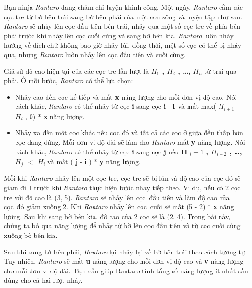 



   Bạn ninja   \emph{    Rantaro   }   đang chăm chỉ luyện khinh công. Một ngày,   \emph{    Rantaro   }   cắm các cọc tre từ bờ bên trái sang bờ bên phải của một con sông và luyện tập như sau:   \emph{    Rantaro   }   sẽ nhảy lên cọc đầu tiên bên trái, nhảy qua một số cọc tre về phía bên phải trước khi nhảy lên cọc cuối cùng và sang bờ bên kia.   \emph{    Rantaro   }   luôn nhảy hướng về đích chứ không bao giờ nhảy lùi, đồng thời, một số cọc có thể bị nhảy qua, nhưng   \emph{    Rantaro   }   luôn nhảy lên cọc đầu tiên và cuối cùng.  

   Giả sử độ cao hiện tại của các cọc tre lần lượt là   \textbf{    $H_{1}$    , $H_{2}$    , …, $H_{n}$}   từ trái qua phải. Ở mỗi bước,   \emph{    Rantaro   }   có thể lựa chọn:  
\begin{itemize}
	\item     Nhảy cao đến cọc kế tiếp và mất    \textbf{     x    }    năng lượng cho mỗi đơn vị độ cao. Nói cách khác,    \emph{     Rantaro    }    có thể nhảy từ cọc    \textbf{     i    }    sang cọc    \textbf{     i+1    }    và mất max(    \textbf{     $H_{i+1}$}    -    \textbf{     $H_{i}$}    , 0) *    \textbf{     x    }    năng lượng.   
	\item     Nhảy xa đến một cọc khác nếu cọc đó và tất cả các cọc ở giữa đều thấp hơn cọc đang đứng. Mỗi đơn vị độ dài sẽ làm cho    \emph{     Rantaro    }    mất    \textbf{     y    }    năng lượng. Nói cách khác,    \emph{     Rantaro    }    có thể nhảy từ cọc    \textbf{     i    }    sang cọc    \textbf{     j    }    nếu    \textbf{     H     \textbf{$_       i+1      $}     , $H_{i+2}$     , …, $H_{j}$     $<$ $H_{i}$}    và mất (    \textbf{     j    }    -    \textbf{     i    }    ) *    \textbf{     y    }    năng lượng.   
\end{itemize}

   Mỗi khi   \emph{    Rantaro   }   nhảy lên một cọc tre, cọc tre sẽ bị lún và độ cao của cọc đó sẽ giảm đi 1 trước khi   \emph{    Rantaro   }   thực hiện bước nhảy tiếp theo. Ví dụ, nếu có 2 cọc tre với độ cao là (3, 5).   \emph{    Rantaro   }   sẽ nhảy lên cọc đầu tiên và làm độ cao của cọc đó giảm xuống 2. Khi   \emph{    Rantaro   }   nhảy lên cọc cuối sẽ mất (5 - 2) *   \textbf{    x   }   năng lượng. Sau khi sang bờ bên kia, độ cao của 2 cọc sẽ là (2, 4). Trong bài này, chúng ta bỏ qua năng lượng để nhảy từ bờ lên cọc đầu tiên và từ cọc cuối cùng xuống bờ bên kia.  

   Sau khi sang bờ bên phải,   \emph{    Rantaro   }   lại nhảy lại về bờ bên trái theo cách tương tự. Tuy nhiên,   \emph{    Rantaro   }   sẽ mất   \textbf{    u   }   năng lượng cho mỗi đơn vị độ cao và   \textbf{    v   }   năng lượng cho mỗi đơn vị độ dài. Bạn cần giúp Rantaro tính tổng số năng lượng ít nhất cần dùng cho cả hai lượt nhảy.  


